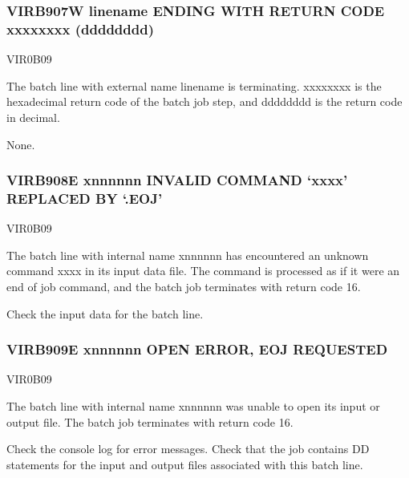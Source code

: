 \documentclass[letterpaper,10pt,english]{sphinxmanual}
\begin{document}
\subsubsection{VIRB907W linename ENDING WITH RETURN CODE xxxxxxxx (dddddddd)}
\label{\detokenize{messages:virb907w-linename-ending-with-return-code-xxxxxxxx-dddddddd}}\begin{description}
\sphinxAtStartPar
VIR0B09

\sphinxAtStartPar
The batch line with external name linename is terminating. xxxxxxxx is the hexadecimal return code of the batch job step, and dddddddd is the return code in decimal.

\sphinxAtStartPar
None.

\end{description}


\subsubsection{VIRB908E x\sphinxhyphen{}nnnnnn INVALID COMMAND ‘xxxx’ REPLACED BY ‘.EOJ’}
\label{\detokenize{messages:virb908e-x-nnnnnn-invalid-command-xxxx-replaced-by-eoj}}\begin{description}
\sphinxAtStartPar
VIR0B09

\sphinxAtStartPar
The batch line with internal name x\sphinxhyphen{}nnnnnn has encountered an unknown command xxxx in its input data file. The command is processed as if it were an end of job command, and the batch job terminates with return code 16.

\sphinxAtStartPar
Check the input data for the batch line.

\end{description}


\subsubsection{VIRB909E x\sphinxhyphen{}nnnnnn OPEN ERROR, EOJ REQUESTED}
\label{\detokenize{messages:virb909e-x-nnnnnn-open-error-eoj-requested}}\begin{description}
\sphinxAtStartPar
VIR0B09

\sphinxAtStartPar
The batch line with internal name x\sphinxhyphen{}nnnnnn was unable to open its input or output file. The batch job terminates with return code 16.

\sphinxAtStartPar
Check the console log for error messages. Check that the job contains DD statements for the input and output files associated with this batch line.

\end{description}
\end{document}
